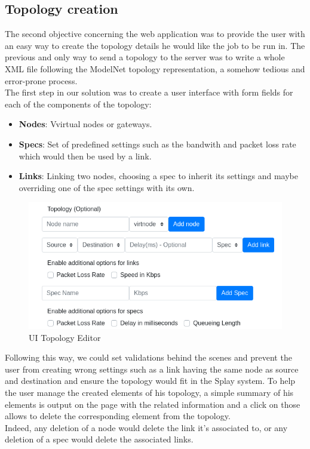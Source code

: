 \documentclass{eplmastersthesis}
\begin{document}
      \subsection{Topology creation}

        The second objective concerning the web application was to provide the
        user with an easy way to create the topology details he would like
        the job to be run in. The previous and only way to send a topology
        to the server was to write a whole XML file following the ModelNet
        topology representation, a somehow tedious and error-prone process.\\

        The first step in our solution was to create a user interface with
        form fields for each of the components of the topology:

        \begin{itemize}
          \item \textbf{Nodes}: Vvirtual nodes or gateways.
          \item \textbf{Specs}: Set of predefined settings such as the
          bandwith and packet loss rate which would then be used by
          a link.
          \item \textbf{Links}: Linking two nodes, choosing a spec to
          inherit its settings and maybe overriding one of the spec settings
          with its own.
        \end{itemize}

        \begin{figure}[H]
          \centering
          \includegraphics[scale=0.6]{figures/editor_topology.png}
          \caption{\label{editor_topology} UI Topology Editor}
        \end{figure}

        Following this way, we could set validations behind the scenes and
        prevent the user from creating wrong settings such as a link having the
        same node as source and destination and ensure the topology would
        fit in the Splay system. To help the user manage the created
        elements of his topology, a simple summary of his elements is
        output on the page with the related information and a click on those
        allows to delete the corresponding element from the topology.\\
        Indeed, any deletion of a node would delete the link it's associated
        to, or any deletion of a spec would delete the associated links.\\
\end{document}
